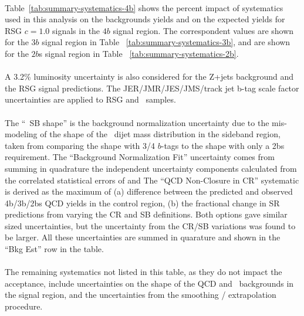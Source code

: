 \paragraph{}
Table~\ref{tab:summary-systematics-4b} shows the percent impact of systematics used in this analysis on the backgrounds yields and on the expected yields for RSG $c=1.0$ signals in the $4b$ signal region. The correspondent values are shown for the $3b$ signal region in Table ~\ref{tab:summary-systematics-3b}, and are shown for the $2b$s signal region in Table ~\ref{tab:summary-systematics-2b}. 

\paragraph{}
A 3.2\% luminosity uncertainty is also considered for the Z+jets background and the RSG signal predictions. The JER/JMR/JES/JMS/track jet b-tag scale factor uncertainties are applied to RSG and \ttbar\ samples. 

\paragraph{}
The ``\ttbar\ SB shape'' is the background normalization uncertainty due to the mis-modeling of the 
shape of the \ttbar\ dijet mass distribution in the sideband region, taken from comparing the shape with 3/4 $b$-tags to the shape with only a 2bs requirement. The ``Background Normalization Fit'' uncertainty comes from summing in quadrature the independent uncertainty components calculated from the correlated statistical errors of \muqcd and \alphatt  The ``QCD Non-Closure in CR'' systematic is derived as the maximum of (a) difference between the predicted and observed 4b/3b/2bs QCD yields in the control region, (b) the fractional change in SR predictions from varying the CR and SB definitions.  Both options gave similar sized uncertainties, but the uncertainty from the CR/SB variations was found to be larger. All these uncertainties are summed in quarature and shown in the ``Bkg Est'' row in the table.

\paragraph{}
The remaining systematics not listed in this table, as they do not impact the acceptance, include uncertainties on the shape of the QCD and \ttbar\ backgrounds in the signal region, and the uncertainties from the smoothing / extrapolation procedure.

